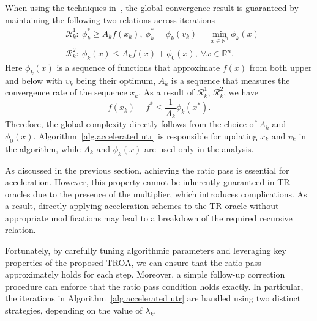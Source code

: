 \documentclass{mcom-l}
\numberwithin{equation}{section}
\begin{document}
When using the techniques in~\cite{nesterov2008accelerating}, the global convergence result is guaranteed by maintaining the following two relations across iterations
\begin{subequations}\label{eq.es relation}
    \begin{align}
        \label{eq.es relation 1}
         & \mathcal{R}_k^1: \ \phi_k^*  \geq A_k f(x_k), \  \phi_k^*= \phi_k(v_k) =\min_{x\in\mathbb{R}^n}\phi_k(x) \\
        \label{eq.es relation 2}
         & \mathcal{R}_k^2: \ \phi_k(x)\leq A_kf(x)+\phi_0(x), \ \forall x\in\mathbb{R}^n.
    \end{align}
\end{subequations}
Here $\phi_k(x)$ is a sequence of functions that approximate $f(x)$ from both upper and below with $v_k$ being their optimum, $A_k$ is a sequence that measures the convergence rate of the sequence $x_k$. As a result of $\mathcal{R}_k^{1}$, $\mathcal{R}_k^2$, we have
\begin{equation*}
    f(x_k)-f^*\leq \frac{1}{A_k}\phi_k(x^*).
\end{equation*}
Therefore, the global complexity directly follows from the choice of $A_k$ and $\phi_0(x)$. Algorithm~\ref{alg.accelerated utr} is responsible for updating $x_k$ and $v_k$ in the algorithm, while $A_k$ and $\phi_k(x)$ are used only in the analysis.

As discussed in the previous section, achieving the ratio pass is essential for acceleration. However, this property cannot be inherently guaranteed in TR oracles due to the presence of the multiplier, which introduces complications. As a result, directly applying acceleration schemes to the TR oracle without appropriate modifications may lead to a breakdown of the required recursive relation.

Fortunately, by carefully tuning algorithmic parameters and leveraging key properties of the proposed TROA, we can ensure that the ratio pass approximately holds for each step. Moreover, a simple follow-up correction procedure can enforce that the ratio pass condition holds exactly. In particular, the iterations in Algorithm~\ref{alg.accelerated utr} are handled using two distinct strategies, depending on the value of $\lambda_k$.
\end{document}
